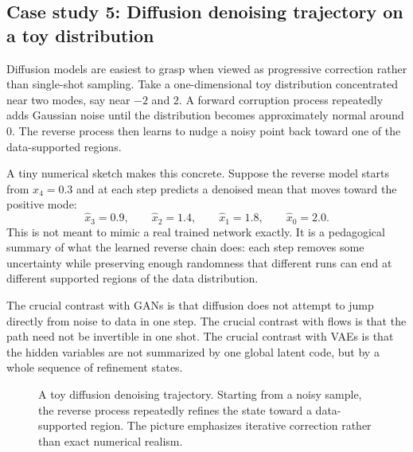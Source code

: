 \subsection*{Case study 5: Diffusion denoising trajectory on a toy distribution}

Diffusion models are easiest to grasp when viewed as progressive correction rather than single-shot sampling.
Take a one-dimensional toy distribution concentrated near two modes, say near $-2$ and $2$.
A forward corruption process repeatedly adds Gaussian noise until the distribution becomes approximately normal around $0$.
The reverse process then learns to nudge a noisy point back toward one of the data-supported regions.

A tiny numerical sketch makes this concrete.
Suppose the reverse model starts from $x_4=0.3$ and at each step predicts a denoised mean that moves toward the positive mode:
\[
\hat x_3=0.9,
\qquad
\hat x_2=1.4,
\qquad
\hat x_1=1.8,
\qquad
\hat x_0=2.0.
\]
This is not meant to mimic a real trained network exactly.
It is a pedagogical summary of what the learned reverse chain does: each step removes some uncertainty while preserving enough randomness that different runs can end at different supported regions of the data distribution.

The crucial contrast with GANs is that diffusion does not attempt to jump directly from noise to data in one step.
The crucial contrast with flows is that the path need not be invertible in one shot.
The crucial contrast with VAEs is that the hidden variables are not summarized by one global latent code, but by a whole sequence of refinement states.

\begin{figure}[h]
\centering
{}
\caption{A toy diffusion denoising trajectory. Starting from a noisy sample, the reverse process repeatedly refines the state toward a data-supported region. The picture emphasizes iterative correction rather than exact numerical realism.}
\label{fig:difftrajectory}
\end{figure}

